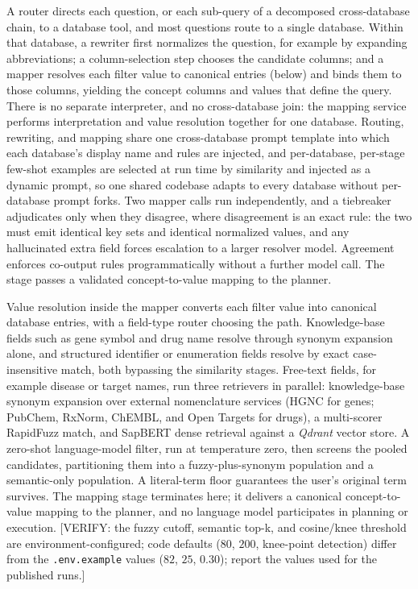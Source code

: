 A router directs each question, or each sub-query of a decomposed cross-database chain, to a database tool, and most questions route to a single database. Within that database, a rewriter first normalizes the question, for example by expanding abbreviations; a column-selection step chooses the candidate columns; and a mapper resolves each filter value to canonical entries (below) and binds them to those columns, yielding the concept columns and values that define the query. There is no separate interpreter, and no cross-database join: the mapping service performs interpretation and value resolution together for one database. Routing, rewriting, and mapping share one cross-database prompt template into which each database's display name and rules are injected, and per-database, per-stage few-shot examples are selected at run time by similarity and injected as a dynamic prompt, so one shared codebase adapts to every database without per-database prompt forks. Two mapper calls run independently, and a tiebreaker adjudicates only when they disagree, where disagreement is an exact rule: the two must emit identical key sets and identical normalized values, and any hallucinated extra field forces escalation to a larger resolver model. Agreement enforces co-output rules programmatically without a further model call. The stage passes a validated concept-to-value mapping to the planner.

Value resolution inside the mapper converts each filter value into canonical database entries, with a field-type router choosing the path. Knowledge-base fields such as gene symbol and drug name resolve through synonym expansion alone, and structured identifier or enumeration fields resolve by exact case-insensitive match, both bypassing the similarity stages. Free-text fields, for example disease or target names, run three retrievers in parallel: knowledge-base synonym expansion over external nomenclature services (HGNC for genes; PubChem, RxNorm, ChEMBL, and Open Targets for drugs), a multi-scorer RapidFuzz match, and SapBERT dense retrieval against a \textit{Qdrant} vector store. A zero-shot language-model filter, run at temperature zero, then screens the pooled candidates, partitioning them into a fuzzy-plus-synonym population and a semantic-only population. A literal-term floor guarantees the user's original term survives. The mapping stage terminates here; it delivers a canonical concept-to-value mapping to the planner, and no language model participates in planning or execution. [VERIFY: the fuzzy cutoff, semantic top-k, and cosine/knee threshold are environment-configured; code defaults ($80$, $200$, knee-point detection) differ from the \texttt{.env.example} values ($82$, $25$, $0.30$); report the values used for the published runs.]

